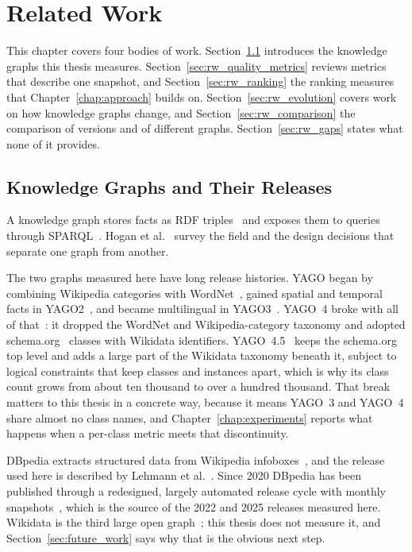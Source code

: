 \chapter{Related Work}
\label{chap:relatedwork}

This chapter covers four bodies of work. Section~\ref{sec:rw_kgs} introduces the
knowledge graphs this thesis measures. Section~\ref{sec:rw_quality_metrics}
reviews metrics that describe one snapshot, and
Section~\ref{sec:rw_ranking} the ranking measures that
Chapter~\ref{chap:approach} builds on. Section~\ref{sec:rw_evolution} covers work
on how knowledge graphs change, and Section~\ref{sec:rw_comparison} the
comparison of versions and of different graphs.
Section~\ref{sec:rw_gaps} states what none of it provides.

\section{Knowledge Graphs and Their Releases}
\label{sec:rw_kgs}

A knowledge graph stores facts as RDF triples~\cite{cyganiak2014rdf} and exposes
them to queries through SPARQL~\cite{harris2013sparql}. Hogan et
al.~\cite{hogan2021knowledge} survey the field and the design decisions that
separate one graph from another.

The two graphs measured here have long release histories. YAGO began by combining
Wikipedia categories with WordNet~\cite{suchanek2007yago,miller1995wordnet}, gained spatial and
temporal facts in YAGO2~\cite{hoffart2013yago2}, and became multilingual in
YAGO3~\cite{mahdisoltani2015yago3}. YAGO~4 broke with all of
that~\cite{tanon2020yago}: it dropped the WordNet and Wikipedia-category
taxonomy and adopted schema.org~\cite{guha2016schema} classes with Wikidata
identifiers. YAGO~4.5~\cite{suchanek2024yago45} keeps the schema.org top level
and adds a large part of the Wikidata taxonomy beneath it, subject to logical
constraints that keep classes and instances apart, which is why its class count
grows from about ten thousand to over a hundred thousand. That break
matters to this thesis in a concrete way, because it means YAGO~3 and YAGO~4
share almost no class names, and Chapter~\ref{chap:experiments} reports what
happens when a per-class metric meets that discontinuity.

DBpedia extracts structured data from Wikipedia
infoboxes~\cite{auer2007dbpedia,bizer2009dbpedia}, and the release used
here is described by Lehmann et al.~\cite{lehmann2015dbpedia}. Since 2020
DBpedia has been published through a redesigned, largely automated release
cycle with monthly snapshots~\cite{hofer2020dbpedia}, which is the source of the
2022 and 2025 releases measured here. Wikidata is the
third large open graph~\cite{vrandecic2014wikidata,erxleben2014introducing};
this thesis does not measure it, and Section~\ref{sec:future_work} says why that
is the obvious next step.

